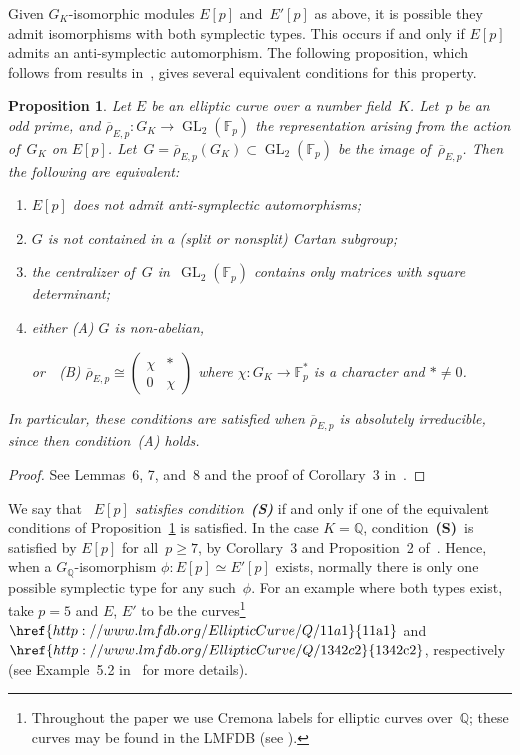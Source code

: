 \documentclass[twoside,leqno,symbols-for-thanks, draft]{rmi}
\numberwithin{equation}{section}
\newcommand{\lmfdbec}[3]{\href{http://www.lmfdb.org/EllipticCurve/Q/#1#2#3}{{\text{\rm#1#2#3}}}}
\newcommand{\condS}{condition~{\bf (S)}}
\newcommand{\Fp}{\mathbb{F}_p}
\newcommand{\Fpstar}{\mathbb{F}_p^*}
\newcommand{\Q}{\mathbb{Q}}
\newcommand{\rhobar}{{\overline{\rho}}}
\newcommand{\GL}{\operatorname{GL}}
\newtheorem{proposition}[theorem]{Proposition}
\theoremstyle{remark}
\begin{document}
Given $G_K$-isomorphic modules $E[p]$ and~$E'[p]$ as above, it is
possible they admit isomorphisms with both symplectic types.  This
occurs if and only if $E[p]$ admits an anti-symplectic automorphism.
The following proposition, which follows from results
in~\cite{FKSym}, gives several equivalent conditions for this property.

\begin{proposition} \label{P:conditionS}
Let $E$ be an elliptic curve over a number field~$K$. Let~$p$ be an
odd prime, and $\rhobar_{E,p} : G_K \to \GL_2(\Fp)$ the representation
arising from the action of~$G_K$ on $E[p]$.
Let~$G=\rhobar_{E,p}(G_K)\subset \GL_2(\Fp)$ be the image
of~$\rhobar_{E,p}$.  Then the following are equivalent:
\begin{enumerate}
\item $E[p]$ does not admit anti-symplectic automorphisms;
\item $G$ is not contained in a (split or nonsplit) Cartan subgroup;
\item the centralizer of~$G$ in~$\GL_2(\Fp)$ contains only matrices
  with square determinant;
\item either (A) $G$ is non-abelian,

  or\ \ (B) $\rhobar_{E,p} \cong \left( \begin{smallmatrix} \chi & * \\ 0 & \chi \end{smallmatrix} \right)$ where $\chi : G_K \to \Fpstar$ is a character
 and $* \neq 0$.
\end{enumerate}
In particular, these conditions are satisfied when $\rhobar_{E,p}$ is
absolutely irreducible, since then condition~(A) holds.
\end{proposition}
\begin{proof} See Lemmas~6, 7, and~8 and the proof of Corollary~3 in~\cite{FKSym}.
 \end{proof}

We say that \emph{~$E[p]$ satisfies \condS} if and
only if one of the equivalent conditions of
Proposition~\ref{P:conditionS} is satisfied.  In the case $K=\Q$,
\condS\ is satisfied by $E[p]$ for all~$p\ge7$, by Corollary~3
  and Proposition~2 of~\cite{FKSym}.  Hence, when a $G_\Q$-isomorphism $\phi :
E[p] \simeq E'[p]$ exists, normally there is only one possible
symplectic type for any such~$\phi$.  For an example where both types
exist, take $p=5$ and $E$, $E'$ to be the curves\footnote{Throughout
  the paper we use Cremona labels for elliptic curves over~$\Q$; these
  curves may be found in the LMFDB (see \cite{lmfdb}).}
$\lmfdbec{11}{a}{1}$ and $\lmfdbec{1342}{c}{2}$, respectively
(see Example~5.2 in~\cite{FKSym} for more details).
\end{document}
